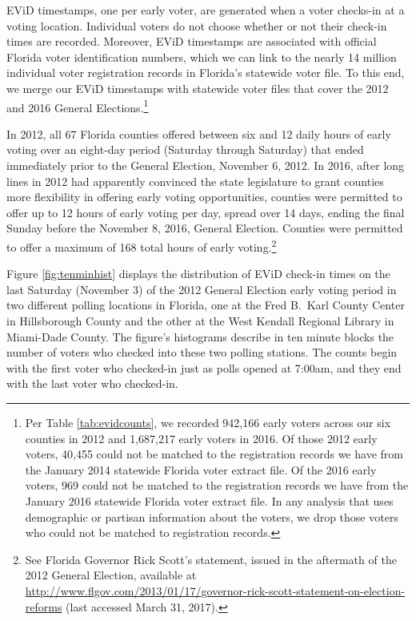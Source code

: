 \documentclass[12pt,titlepage]{article}
\begin{document}


EViD timestamps, one per early voter, are generated when a voter
checks-in at a voting location.  Individual voters do not choose
whether or not their check-in times are recorded.  Moreover, EViD
timestamps are associated with official Florida voter identification
numbers, which we can link to the nearly 14 million individual voter
registration records in Florida's statewide voter file.  To this end,
we merge our EViD timestamps with statewide voter files that cover the
2012 and 2016 General Elections.\footnote{Per Table
  \ref{tab:evidcounts}, we recorded 942,166 early voters across our
  six counties in 2012 and 1,687,217 early voters in 2016.  Of those
  2012 early voters, 40,455 could not be matched to the registration
  records we have from the January 2014 statewide Florida voter
  extract file.  Of the 2016 early voters, 969 could not be matched to
  the registration records we have from the January 2016 statewide
  Florida voter extract file.  In any analysis that uses demographic
  or partisan information about the voters, we drop those voters who
  could not be matched to registration records.}




In 2012, all 67  Florida counties offered between six and 12 daily
hours of early voting over an eight-day period (Saturday through
Saturday) that ended immediately prior to the General Election,
November 6, 2012.  In 2016, after long lines in 2012 had apparently
convinced the state legislature to grant counties more flexibility in
offering early voting opportunities, counties were permitted to offer
up to 12 hours of early voting per day, spread over 14 days, ending
the final Sunday before the November 8, 2016, General Election.
Counties were permitted to offer a maximum of 168 total hours of early
voting.\footnote{See Florida Governor Rick Scott's statement, issued
  in the aftermath of the 2012 General Election, available at
  \url{http://www.flgov.com/2013/01/17/governor-rick-scott-statement-on-election-reforms}
  (last accessed March 31, 2017).}

Figure \ref{fig:tenminhist} displays the distribution of EViD check-in
times on the last Saturday (November 3) of the 2012 General Election
early voting period in two different polling locations in Florida, one
at the Fred B.\ Karl County Center in Hillsborough County and the
other at the West Kendall Regional Library in Miami-Dade County.  The
figure's histograms describe in ten minute blocks the number of voters
who checked into these two polling stations.  The counts begin with
the first voter who checked-in just as polls opened at 7:00am, and
they end with the last voter who checked-in.
\end{document}

